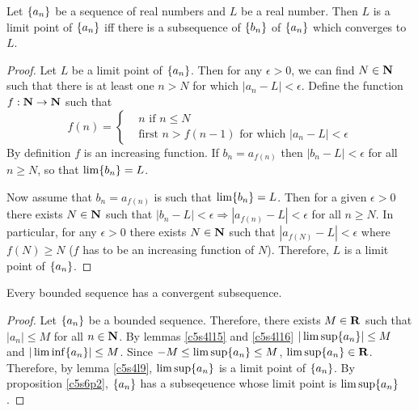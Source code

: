 \begin{prop}\label{c5s6p2}
Let $\{a_n\}$ be a sequence of real numbers and $L$ be a real number.
Then $L$ is a limit point of $\{a_n\}$ iff there is a subsequence of
$\{b_n\}$ of $\{a_n\}$ which converges to $L$.
\end{prop}
\begin{proof}
Let $L$ be a limit point of $\{a_n\}$. Then for any $\epsilon > 0$, we
can find $N \in \mathbf{N}$ such that there is at least one $n > N$ for which
$|a_n - L| < \epsilon$. Define the function $f: \mathbf{N} \rightarrow \mathbf{N}$
such that
\[
f(n) = \begin{cases}
 & n \text{ if } n \le N \\
 & \text{first } n > f(n - 1) \text{ for which } |a_n - L| < \epsilon
\end{cases}
\]
By definition $f$ is an increasing function. If $b_n = a_{f(n)}$ then $|b_n
- L| < \epsilon$ for all $n \ge N$, so that $\lim\{b_n\} = L$.

Now assume that $b_n = a_{f(n)}$ is such that $\lim\{b_n\} = L$. Then
for a given $\epsilon > 0$ there exists $N \in \mathbf{N}$ such that $|b_n - L|
< \epsilon \Rightarrow |a_{f(n)} - L| < \epsilon$ for all $n \ge N$. In
particular, for any $\epsilon > 0$ there exists $N \in \mathbf{N}$ such that
$|a_{f(N)} - L| < \epsilon$ where $f(N) \ge N$ ($f$ has to be an increasing
function of $N$). Therefore, $L$ is a limit point of $\{a_n\}$.
\end{proof}

\begin{thm}\label{c5s6t1}
Every bounded sequence has a convergent subsequence.
\end{thm}
\begin{proof}
Let $\{a_n\}$ be a bounded sequence. Therefore, there exists $M \in \mathbf{R}$
such that $|a_n| \le M$ for all $n \in \mathbf{N}$. By lemmas \ref{c5s4l15} and
\ref{c5s4l16} $|\limsup\{a_n\}| \le M$ and $|\liminf\{a_n\}| \le M$.
Since $-M \le \limsup\{a_n\} \le M$, $\limsup\{a_n\} \in \mathbf{R}$. 
Therefore, by lemma \ref{c5s4l9}, $\limsup\{a_n\}$ is a limit point of
$\{a_n\}$. By proposition \ref{c5s6p2}, $\{a_n\}$ has a subseqeuence
whose limit point is $\limsup\{a_n\}$.
\end{proof}

